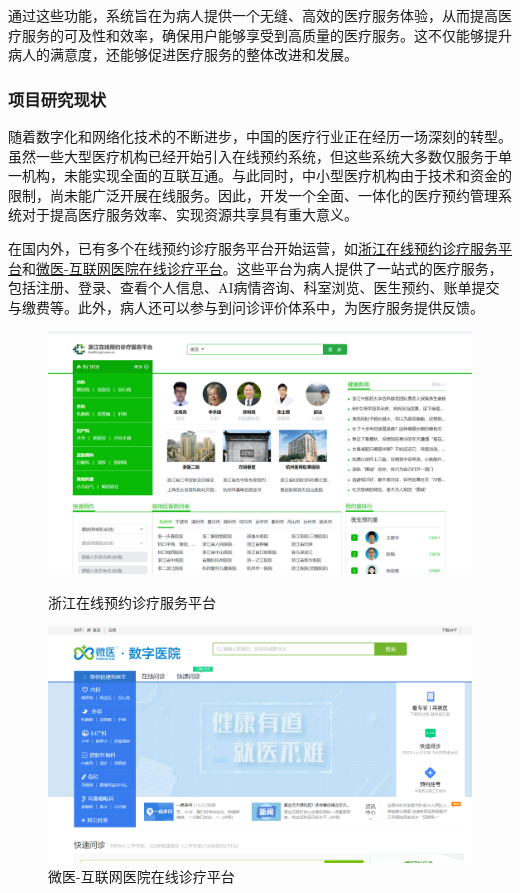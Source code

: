 通过这些功能，系统旨在为病人提供一个无缝、高效的医疗服务体验，从而提高医疗服务的可及性和效率，确保用户能够享受到高质量的医疗服务。这不仅能够提升病人的满意度，还能够促进医疗服务的整体改进和发展。

\subsubsection{项目研究现状}
随着数字化和网络化技术的不断进步，中国的医疗行业正在经历一场深刻的转型。虽然一些大型医疗机构已经开始引入在线预约系统，但这些系统大多数仅服务于单一机构，未能实现全面的互联互通。与此同时，中小型医疗机构由于技术和资金的限制，尚未能广泛开展在线服务。因此，开发一个全面、一体化的医疗预约管理系统对于提高医疗服务效率、实现资源共享具有重大意义。

在国内外，已有多个在线预约诊疗服务平台开始运营，如\href{http://www.zjol.com.cn}{浙江在线预约诊疗服务平台}和\href{http://www.wedoctor.com}{微医-互联网医院在线诊疗平台}。这些平台为病人提供了一站式的医疗服务，包括注册、登录、查看个人信息、AI病情咨询、科室浏览、医生预约、账单提交与缴费等。此外，病人还可以参与到问诊评价体系中，为医疗服务提供反馈。

\begin{figure}[htbp]
	\centering
	\begin{minipage}[b]{0.5\textwidth}
		\includegraphics[width=\textwidth]{figures/01.png} %
		\caption{浙江在线预约诊疗服务平台}
	\end{minipage}%
	\begin{minipage}[b]{0.5\textwidth}
		\includegraphics[width=\textwidth]{figures/02.png} %
		\caption{微医-互联网医院在线诊疗平台}
	\end{minipage}
\end{figure}


